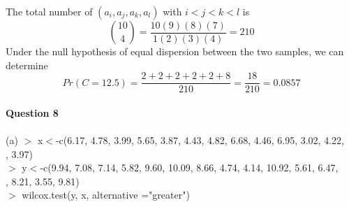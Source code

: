 \documentclass[12pt,a4paper]{article}
\begin{document}
The total number of $(a_{i},a_{j},a_{k},a_{l})$ with $i<j<k<l$ is
$${10 \choose 4}=\dfrac{10(9)(8)(7)}{1(2)(3)(4)}=210$$
Under the null hypothesis of equal dispersion between the two samples, we can determine
$$Pr(C=12.5)=\dfrac{2+2+2+2+2+8}{210}=\dfrac{18}{210}=0.0857$$
~\\
\indent \textbf{Question 8}\\
~\\
(a) $>$ x$<$-c(6.17, 4.78, 3.99, 5.65, 3.87, 4.43, 4.82, 6.68, 4.46, 6.95, 3.02, 4.22, \\ \indent\indent{}, 3.97)\\
\indent $>$ y$<$-c(9.94, 7.08, 7.14, 5.82, 9.60, 10.09, 8.66, 4.74, 4.14, 10.92, 5.61, 6.47, \\ \indent\indent{}, 8.21, 3.55, 9.81)\\
\indent $>$ wilcox.test(y, x, alternative ="greater")\\
\end{document}
